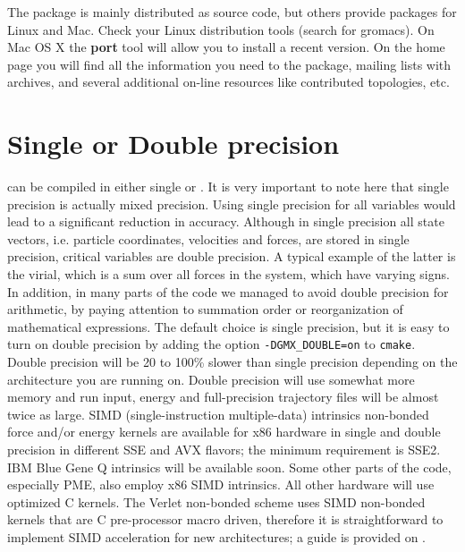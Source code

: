 The package is mainly distributed as source code, but others provide
packages for Linux and Mac. Check your Linux distribution tools
(search for gromacs). On Mac OS X the {\bf port} tool will allow you
to install a recent version.
On the home page you will find all the information you need to 
 the package, mailing lists with archives,
and several additional on-line resources like contributed topologies, etc.

\section{Single or Double precision}
{\gromacs} can be compiled in either single or
. It is very important to note here that
single precision is actually mixed precision. Using single precision
for all variables would lead to a significant reduction in accuracy.
Although in single precision all state vectors, i.e. particle coordinates,
velocities and forces, are stored in single precision, critical variables
are double precision. A typical example of the latter is the virial,
which is a sum over all forces in the system, which have varying signs.
In addition, in many parts of the code we managed to avoid double precision
for arithmetic, by paying attention to summation order or reorganization
of mathematical expressions. The default choice is single precision,
but it is easy to turn on double precision by adding the option
{\tt -DGMX_DOUBLE=on} to {\tt cmake}. Double precision
will be 20 to 100\% slower than single precision depending on the
architecture you are running on. Double precision will use somewhat
more memory and run input, energy and full-precision trajectory files
will be almost twice as large.  SIMD (single-instruction multiple-data)
intrinsics non-bonded force and/or energy kernels are available for x86
hardware in single and double precision in different SSE and AVX flavors;
the minimum requirement is SSE2.
IBM Blue Gene Q intrinsics will be available soon. Some other parts of
the code, especially PME, also employ x86 SIMD intrinsics. All other
hardware will use optimized C kernels. The Verlet non-bonded scheme
uses SIMD non-bonded kernels that are C pre-processor macro driven,
therefore it is straightforward to implement SIMD acceleration
for new architectures; a guide is provided on {\wwwpage}.

